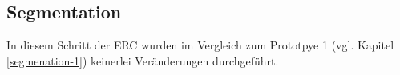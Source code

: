 \subsection{Segmentation} \label{segmenation-4}

In diesem Schritt der ERC wurden im Vergleich zum Prototpye 1 (vgl. Kapitel \ref{segmenation-1}) keinerlei Veränderungen durchgeführt. \\